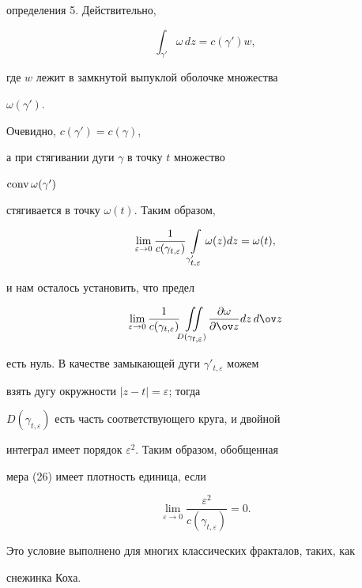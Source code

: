 определения 5. Действительно, 


$$ 


\int_{\gamma'}\omega\,dz=c(\gamma')w, 


$$ 


где $w$ лежит в замкнутой выпуклой оболочке множества 


$\omega(\gamma')$. 


Очевидно, $c(\gamma')=c(\gamma)$, 


а при стягивании дуги $\gamma$ в точку $t$ множество 


$\operatorname{conv}\omega(\gamma')$ 


стягивается в точку $\omega(t)$. Таким образом, 


$$ 


\lim_{\varepsilon\to 0}\frac{1}{c(\gamma_{t,\varepsilon})} 


\intl_{\gamma'_{\scriptstyle t,\varepsilon}}\omega(z)dz=\omega(t), 


$$ 


и нам осталось установить, что предел 


$$ 


\lim_{\varepsilon\to 0}\frac{1}{c(\gamma_{t,\varepsilon})} 


\iint\limits_{D(\gamma_{\scriptstyle t,\varepsilon})}


\myfrac{\omega}{\ov z} dz\,d\ov z 


$$ 


есть нуль. В качестве замыкающей дуги $\gamma'_{t,\varepsilon}$ можем 


взять дугу окружности $|z-t|=\varepsilon$; тогда 


$D(\gamma_{t,\varepsilon})$ есть часть соответствующего круга, и двойной 


интеграл имеет порядок $\varepsilon^2$. Таким образом, обобщенная 


мера (26) имеет плотность единица, если 


\begin{equation} 


\lim_{\varepsilon\to 0} 


\frac{\varepsilon^2}{c(\gamma_{t,\varepsilon})}=0. 


\end{equation} 


Это условие выполнено для многих классических фракталов, таких, как 


снежинка Коха. 


 


